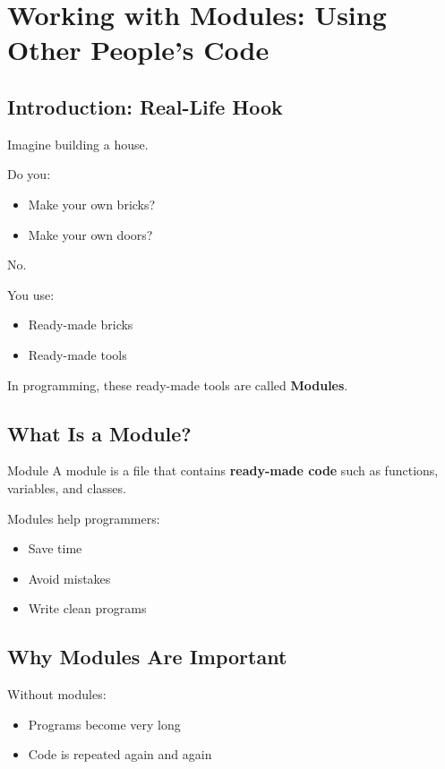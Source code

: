 \chapter{Working with Modules: Using Other People’s Code}

\section{Introduction: Real-Life Hook}

Imagine building a house.

Do you:
\begin{itemize}
    \item Make your own bricks?
    \item Make your own doors?
\end{itemize}

No.

You use:
\begin{itemize}
    \item Ready-made bricks
    \item Ready-made tools
\end{itemize}

In programming, these ready-made tools are called \textbf{Modules}.

\section{What Is a Module?}

\begin{definition}{Module}
A module is a file that contains \textbf{ready-made code} such as functions, variables, and classes.
\end{definition}

Modules help programmers:
\begin{itemize}
    \item Save time
    \item Avoid mistakes
    \item Write clean programs
\end{itemize}

\section{Why Modules Are Important}

Without modules:
\begin{itemize}
    \item Programs become very long
    \item Code is repeated again and again
\end{itemize}

